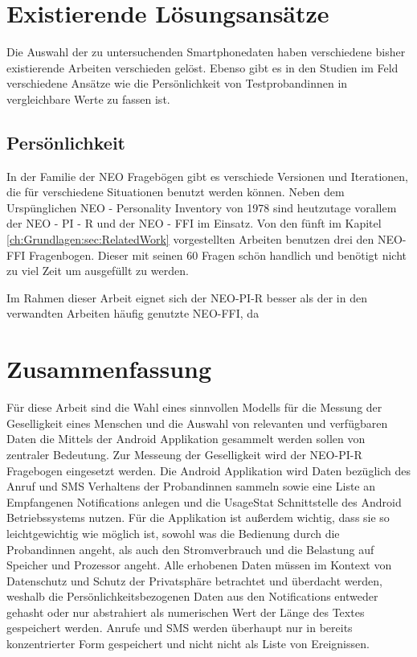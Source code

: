 \section{Existierende Lösungsansätze}
\label{ch:Analyse:sec:RelatedWork}

Die Auswahl der zu untersuchenden Smartphonedaten haben verschiedene bisher existierende Arbeiten verschieden gelöst.
Ebenso gibt es in den Studien im Feld verschiedene Ansätze wie die Persönlichkeit von Testprobandinnen in vergleichbare Werte zu fassen ist.

\subsection{Persönlichkeit}

In der Familie der NEO Fragebögen gibt es verschiede Versionen und Iterationen, die für verschiedene Situationen benutzt werden können.
Neben dem Urspünglichen NEO - Personality Inventory von 1978 sind heutzutage vorallem der NEO - PI - R und der NEO - FFI im Einsatz.
Von den fünft im Kapitel \ref{ch:Grundlagen:sec:RelatedWork} vorgestellten Arbeiten benutzen drei den NEO-FFI Fragenbogen. 
Dieser mit seinen 60 Fragen schön handlich und benötigt nicht zu viel Zeit um ausgefüllt zu werden.


\par
Im Rahmen dieser Arbeit eignet sich der NEO-PI-R besser als der in den verwandten Arbeiten häufig genutzte NEO-FFI, 
da 

\section{Zusammenfassung}
\label{ch:Analyse:sec:zusammenfassung}

Für diese Arbeit sind die Wahl eines sinnvollen Modells für die Messung der Geselligkeit eines Menschen 
und die Auswahl von relevanten und verfügbaren Daten die Mittels der Android Applikation gesammelt werden sollen von zentraler Bedeutung.
Zur Messeung der Geselligkeit wird der NEO-PI-R Fragebogen eingesetzt werden.
Die Android Applikation wird Daten bezüglich des Anruf und SMS Verhaltens der Probandinnen sammeln sowie
eine Liste an Empfangenen Notifications anlegen und die UsageStat Schnittstelle des Android Betriebssystems nutzen.
Für die Applikation ist außerdem wichtig, dass sie so leichtgewichtig wie möglich ist, 
sowohl was die Bedienung durch die Probandinnen angeht, als auch den Stromverbrauch und die Belastung auf Speicher und Prozessor angeht.
Alle erhobenen Daten müssen im Kontext von Datenschutz und Schutz der Privatsphäre betrachtet und überdacht werden, weshalb die Persönlichkeitsbezogenen Daten aus den Notifications entweder gehasht oder nur abstrahiert als numerischen Wert der Länge des Textes gespeichert werden.
Anrufe und SMS werden überhaupt nur in bereits konzentrierter Form gespeichert und nicht nicht als Liste von Ereignissen.

